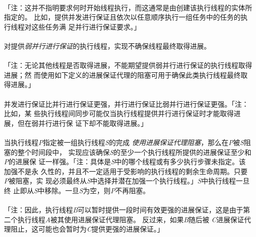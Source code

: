 \paragraph{}
「注：这并不指明要求何时开始线程执行，而这通常是由创建该执行线程的实体所指定的。
比如，提供并发进行保证且依次以任意顺序执行一组任务中的任务的执行线程对这些任务满
足并行进行保证要求。」

\paragraph{}
对提供\textit{弱并行进行保证}的执行线程，实现不确保线程最终取得进展。

\paragraph{}
「注：无论其他线程是否取得进展，不能期望提供弱并行进行保证的执行线程取得进展；然
而使用如下定义的进展保证代理的阻塞可用于确保此类执行线程最终取得进展。」

\paragraph{}
并发进行保证比并行进行保证更强，并行进行保证比弱并行进行保证更强。「注：比如，某
些执行线程间同步可能仅当执行线程提供并行进行保证时才能取得进展，但在弱并行进行保
证下却不能取得进展。」

\paragraph{}
当执行线程\textit{P}指定被一组执行线程\textit{S}的完成
\textit{使用进展保证代理阻塞}，那么在\textit{P}被\textit{S}阻塞的整个时间段中，
实现应该确保\textit{S}的至少一个执行线程所提供的进展保证至少和\textit{P}的进展保
证一样强。「注：具体是\textit{S}中的哪个线程或有多少执行步骤未指定。该加强不是永
久性的，并且不一定适用于受影响的执行线程的剩余生命周期。只要\textit{P}被阻塞，实
现必须最终从\textit{S}中选择并潜在加强一个执行线程。」\textit{S}中执行线程一旦终
止即从\textit{S}中移除。一旦\textit{S}为空，则\textit{P}不再阻塞。

\paragraph{}
「注：因此，执行线程\textit{B}可以暂时提供一段时间有效更强的进展保证，这是由于第
二个执行线程\textit{A}被其使用进展保证代理阻塞。 反过来，如果\textit{B}随后被
\textit{C}进展保证代理阻止，这可能也会暂时为\textit{C}提供更强的进展保证。」

